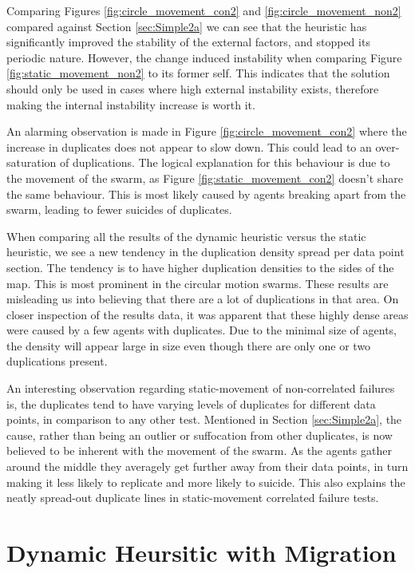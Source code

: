 \documentclass{UoYCSproject}
\begin{document}
Comparing Figures \ref{fig:circle_movement_con2} and \ref{fig:circle_movement_non2} compared against Section \ref{sec:Simple2a} we can see that the heuristic has significantly improved the stability of the external factors, and stopped its periodic nature.
However, the change induced instability when comparing Figure \ref{fig:static_movement_non2} to its former self.
This indicates that the solution should only be used in cases where high external instability exists, therefore making the internal instability increase is worth it.

An alarming observation is made in Figure \ref{fig:circle_movement_con2} where the increase in duplicates does not appear to slow down.
This could lead to an over-saturation of duplications.
The logical explanation for this behaviour is due to the movement of the swarm, as Figure \ref{fig:static_movement_con2} doesn’t share the same behaviour.
This is most likely caused by agents breaking apart from the swarm, leading to fewer suicides of duplicates.

When comparing all the results of the dynamic heuristic versus the static heuristic, we see a new tendency in the duplication density spread per data point section.
The tendency is to have higher duplication densities to the sides of the map.
This is most prominent in the circular motion swarms.
These results are misleading us into believing that there are a lot of duplications in that area.
On closer inspection of the results data, it was apparent that these highly dense areas were caused by a few agents with duplicates. Due to the minimal size of agents, the density will appear large in size even though there are only one or two duplications present.

An interesting observation regarding static-movement of non-correlated failures is, the duplicates tend to have varying levels of duplicates for different data points, in comparison to any other test.
Mentioned in Section \ref{sec:Simple2a}, the cause, rather than being an outlier or suffocation from other duplicates, is now believed to be inherent with the movement of the swarm.
As the agents gather around the middle they averagely get further away from their data points, in turn making it less likely to replicate and more likely to suicide.
This also explains the neatly spread-out duplicate lines in static-movement correlated failure tests.

\section{Dynamic Heursitic with Migration}
\label{sec:Simple4a}
\end{document}
